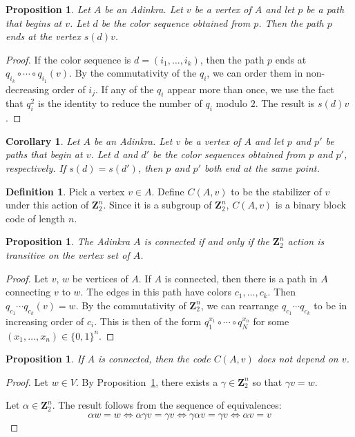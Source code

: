 \documentclass[12pt,twoside,singlespace]{article}
\numberwithin{equation}{section}
\newtheorem{cor}[equation]{Corollary}
\newtheorem{prop}[equation]{Proposition}
\theoremstyle{definition}
\newtheorem{definition}[equation]{Definition}
\newcommand{\ZZ}{\mathbf{Z}}
\begin{document}
\begin{prop}
\label{prop:colorseqpath}
Let $A$ be an Adinkra.  Let $v$ be a vertex of $A$ and let $p$ be a path that begins at $v$.  Let $d$ be the color sequence obtained from $p$.  Then the path $p$ ends at the vertex $s(d)v$.
\end{prop}
\begin{proof}
If the color sequence is $d=(i_1,\ldots,i_k)$, then the path $p$ ends at
$q_{i_k}\circ \cdots \circ q_{i_1}(v)$.  By the commutativity of the $q_i$, we can order them in non-decreasing order of $i_j$.  If any of the $q_i$ appear more than once, we use the fact that $q_i^2$ is the identity to reduce the number of $q_i$ modulo $2$.  The result is $s(d)v$.
\end{proof}


\begin{cor}
\label{prop:pathands}
Let $A$ be an Adinkra.  Let $v$ be a vertex of $A$ and let $p$ and $p'$ be paths that begin at $v$.  Let $d$ and $d'$ be the color sequences obtained from $p$ and $p'$, respectively.  If $s(d)=s(d')$, then $p$ and $p'$ both end at the same point.
\end{cor}



\begin{definition}
Pick a vertex $v\in A$.  Define $C(A,v)$ to be the stabilizer of $v$ under this action of $\ZZ_2^n$.  Since it is a subgroup of $\ZZ_2^n$, $C(A,v)$ is a binary block code of length $n$.
\end{definition}

\begin{prop}
\label{prop:transitive}
The Adinkra $A$ is connected if and only if the $\ZZ_2^n$ action is transitive on the vertex set of $A$.
\end{prop}
\begin{proof}
Let $v$, $w$ be vertices of $A$.  If $A$ is connected, then there is a path in $A$ connecting $v$ to $w$.  The edges in this path have colors $c_1,\ldots,c_k$.  Then $q_{c_1}\cdots q_{c_k}(v)=w$.  By the commutativity of $\ZZ_2^n$, we can rearrange $q_{c_1}\cdots q_{c_k}$ to be in increasing order of $c_i$.  This is then of the form $q_1^{x_1}\circ \cdots \circ q_N^{x_n}$ for some $(x_1,\ldots,x_n)\in \{0,1\}^n$.
\end{proof}

\begin{prop}
If $A$ is connected, then the code $C(A,v)$ does not depend on $v$.
\end{prop}
\begin{proof}
Let $w\in V$.  By Proposition~\ref{prop:transitive}, there exists a $\gamma\in \ZZ_2^n$ so that $\gamma v=w$.

Let $\alpha\in \ZZ_2^n$.  The result follows from the sequence of equivalences:
\[\alpha w=w\Leftrightarrow \alpha\gamma v=\gamma v \Leftrightarrow \gamma \alpha v=\gamma v \Leftrightarrow \alpha v=v\]
\end{proof}
\end{document}
